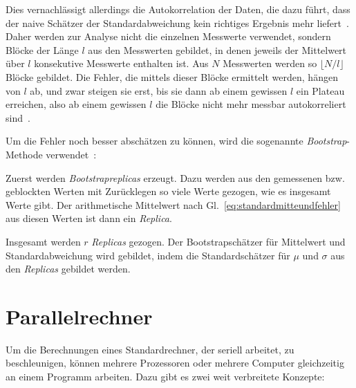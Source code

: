 	Dies vernachlässigt allerdings die Autokorrelation der Daten, die dazu führt, dass der naive Schätzer der Standardabweichung kein richtiges Ergebnis mehr liefert~\cite[vgl. ][S. 72 ff.]{skriptcompphys}. Daher werden zur Analyse nicht die einzelnen Messwerte verwendet, sondern Blöcke der Länge $l$ aus den Messwerten gebildet, in denen jeweils der Mittelwert über $l$ konsekutive Messwerte enthalten ist. Aus $N$ Messwerten werden so $\lfloor N/l \rfloor$ Blöcke gebildet. Die Fehler, die mittels dieser Blöcke ermittelt werden, hängen von $l$ ab, und zwar steigen sie erst, bis sie dann ab einem gewissen $l$ ein Plateau erreichen, also ab einem gewissen $l$ die Blöcke nicht mehr messbar autokorreliert sind~\cite[vgl. ][S. 75 ff.]{skriptcompphys}.
	
	
	
	
	Um die Fehler noch besser abschätzen zu können, wird die sogenannte \textit{Bootstrap}-Methode verwendet~\cite[vgl. ][S. 64 ff.]{skriptcompphys}:
	
	Zuerst werden \textit{Bootstrapreplicas} erzeugt. Dazu werden aus den gemessenen bzw. geblockten Werten mit Zurücklegen so viele Werte gezogen, wie es insgesamt Werte gibt. Der arithmetische Mittelwert nach Gl.~\ref{eq:standardmitteundfehler} aus diesen Werten ist dann ein \textit{Replica}.
	
	Insgesamt werden $r$ \textit{Replicas} gezogen. Der Bootstrapschätzer für Mittelwert und Standardabweichung wird gebildet, indem die Standardschätzer für $\mu$ und $\sigma$ aus den \textit{Replicas} gebildet werden.
	
	


	\section{Parallelrechner}
	\label{sec:partheorie}
	Um die Berechnungen eines Standardrechner, der seriell arbeitet, zu beschleunigen, können mehrere Prozessoren oder mehrere Computer gleichzeitig an einem Programm arbeiten. Dazu gibt es zwei weit verbreitete Konzepte:
